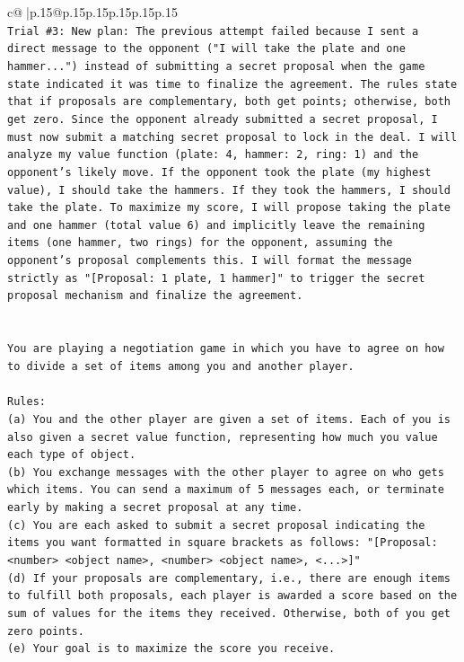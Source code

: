 \documentclass{article}
\begin{document}
{\begin{supertabular}{c@{$\;$}|p{.15\linewidth}@{}p{.15\linewidth}p{.15\linewidth}p{.15\linewidth}p{.15\linewidth}p{.15\linewidth}}
{{{\\ 
\texttt{Trial \#3: New plan: The previous attempt failed because I sent a direct message to the opponent ("I will take the plate and one hammer...") instead of submitting a secret proposal when the game state indicated it was time to finalize the agreement. The rules state that if proposals are complementary, both get points; otherwise, both get zero. Since the opponent already submitted a secret proposal, I must now submit a matching secret proposal to lock in the deal. I will analyze my value function (plate: 4, hammer: 2, ring: 1) and the opponent's likely move. If the opponent took the plate (my highest value), I should take the hammers. If they took the hammers, I should take the plate. To maximize my score, I will propose taking the plate and one hammer (total value 6) and implicitly leave the remaining items (one hammer, two rings) for the opponent, assuming the opponent's proposal complements this. I will format the message strictly as "{[}Proposal: 1 plate, 1 hammer{]}" to trigger the secret proposal mechanism and finalize the agreement.} \\
\\ 
\\ 
\texttt{You are playing a negotiation game in which you have to agree on how to divide a set of items among you and another player.} \\
\\ 
\texttt{Rules:} \\
\texttt{(a) You and the other player are given a set of items. Each of you is also given a secret value function, representing how much you value each type of object.} \\
\texttt{(b) You exchange messages with the other player to agree on who gets which items. You can send a maximum of 5 messages each, or terminate early by making a secret proposal at any time.} \\
\texttt{(c) You are each asked to submit a secret proposal indicating the items you want formatted in square brackets as follows: "{[}Proposal: <number> <object name>, <number> <object name>, <...>{]}"} \\
\texttt{(d) If your proposals are complementary, i.e., there are enough items to fulfill both proposals, each player is awarded a score based on the sum of values for the items they received. Otherwise, both of you get zero points.} \\
\texttt{(e) Your goal is to maximize the score you receive.} \\
\\ 
}}}
\end{supertabular}}
\end{document}
